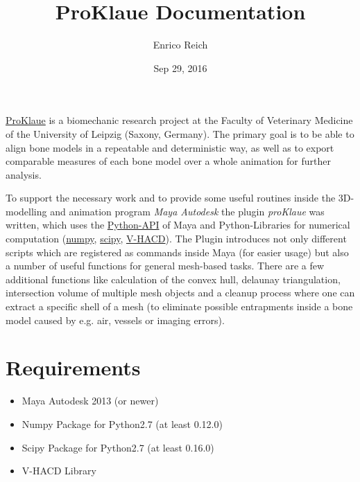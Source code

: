 \documentclass[letterpaper,10pt,english]{sphinxmanual}
\title{ProKlaue Documentation}
\date{Sep 29, 2016}
\author{Enrico Reich}
\begin{document}
\maketitle
\tableofcontents
{}\label{index::doc}

\label{index:module-proKlaue}
\href{http://www.zv.uni-leipzig.de/service/kommunikation/medienredaktion/nachrichten.html?ifab\_modus=detail\&ifab\_id=6004}{ProKlaue} is a biomechanic research project at the Faculty of Veterinary Medicine of the University of Leipzig (Saxony, Germany). The primary goal is to be able to align bone models in a repeatable and deterministic way, as well as to export comparable measures of each bone model over a whole animation for further analysis.

To support the necessary work and to provide some useful routines inside the 3D-modelling and animation program \emph{Maya Autodesk} the plugin \emph{proKlaue} was written, which uses the \href{http://download.autodesk.com/us/maya/2011help/CommandsPython/}{Python-API} of Maya and Python-Libraries for numerical computation (\href{http://www.numpy.org/}{numpy}, \href{https://www.scipy.org/}{scipy}, \href{https://github.com/kmammou/v-hacd}{V-HACD}). The Plugin introduces not only different scripts which are registered as commands inside Maya (for easier usage) but also a number of useful functions for general mesh-based tasks. There are a few additional functions like calculation of the convex hull, delaunay triangulation, intersection volume of multiple mesh objects and a cleanup process where one can extract a specific shell of a mesh (to eliminate possible entrapments inside a bone model caused by e.g. air, vessels or imaging errors).


\chapter{Requirements}
\label{index:welcome-to-proklaue-s-documentation}\label{index:main}\label{index:requirements}\label{index:module-proKlaue}\begin{itemize}
\item {} 
Maya Autodesk 2013 (or newer)

\item {} 
Numpy Package for Python2.7 (at least 0.12.0)

\item {} 
Scipy Package for Python2.7 (at least 0.16.0)

\item {} 
V-HACD Library

\end{itemize}
\end{document}

